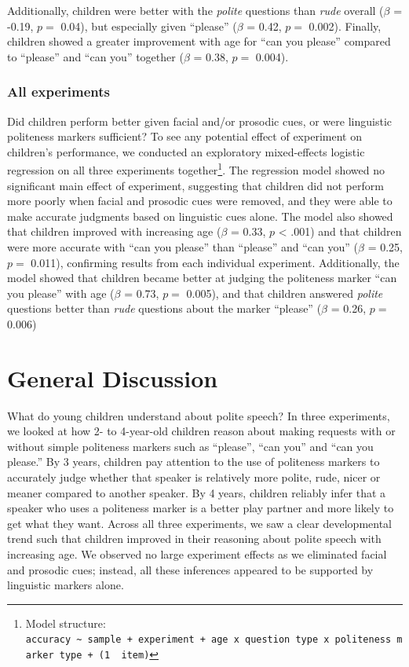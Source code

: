 \documentclass[10pt, letterpaper]{article}
\begin{document}
Additionally, children were better with the \emph{polite} questions than
\emph{rude} overall (\(\beta\) = -0.19, \(p =\) 0.04), but especially
given ``please'' (\(\beta\) = 0.42, \(p =\) 0.002). Finally, children
showed a greater improvement with age for ``can you please'' compared to
``please'' and ``can you'' together (\(\beta\) = 0.38, \(p =\) 0.004).

\subsubsection{All experiments}\label{all-experiments}

Did children perform better given facial and/or prosodic cues, or were
linguistic politeness markers sufficient? To see any potential effect of
experiment on children's performance, we conducted an exploratory
mixed-effects logistic regression on all three experiments
together\footnote{Model structure:
  \texttt{accuracy\ \textasciitilde{}\ sample\ +\ experiment\ +\ age\ x\ question\ type\ x\ politeness\ marker\ type\ +\ (1\ \textbar{}\ item)}}.
The regression model showed no significant main effect of experiment,
suggesting that children did not perform more poorly when facial and
prosodic cues were removed, and they were able to make accurate
judgments based on linguistic cues alone. The model also showed that
children improved with increasing age (\(\beta\) = 0.33, \(p\)
\textless{} .001) and that children were more accurate with ``can you
please'' than ``please'' and ``can you'' (\(\beta\) = 0.25, \(p =\)
0.011), confirming results from each individual experiment.
Additionally, the model showed that children became better at judging
the politeness marker ``can you please'' with age (\(\beta\) = 0.73,
\(p =\) 0.005), and that children answered \emph{polite} questions
better than \emph{rude} questions about the marker ``please'' (\(\beta\)
= 0.26, \(p =\) 0.006)

\section{General Discussion}\label{general-discussion}

What do young children understand about polite speech? In three
experiments, we looked at how 2- to 4-year-old children reason about
making requests with or without simple politeness markers such as
``please'', ``can you'' and ``can you please.'' By 3 years, children pay
attention to the use of politeness markers to accurately judge whether
that speaker is relatively more polite, rude, nicer or meaner compared
to another speaker. By 4 years, children reliably infer that a speaker
who uses a politeness marker is a better play partner and more likely to
get what they want. Across all three experiments, we saw a clear
developmental trend such that children improved in their reasoning about
polite speech with increasing age. We observed no large experiment
effects as we eliminated facial and prosodic cues; instead, all these
inferences appeared to be supported by linguistic markers alone.
\end{document}
